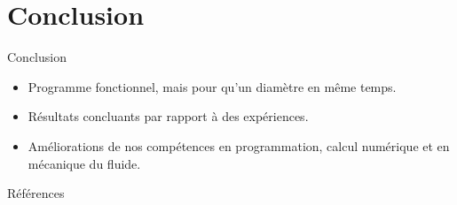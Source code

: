 \documentclass[aspectratio=169,xcolor=dvipsnames]{beamer}
\begin{document}
\section{Conclusion}
\begin{frame}{Conclusion}
    \begin{itemize}
        \item Programme fonctionnel, mais pour qu'un diamètre en même temps.
        \item Résultats concluants par rapport à des expériences.
        \item Améliorations de nos compétences en programmation, calcul numérique et en mécanique du fluide.
    \end{itemize}
\end{frame}

\begin{frame}{Références}
    \nocite{*}
    \printbibliography[title = Références]
\end{frame}
\end{document}
